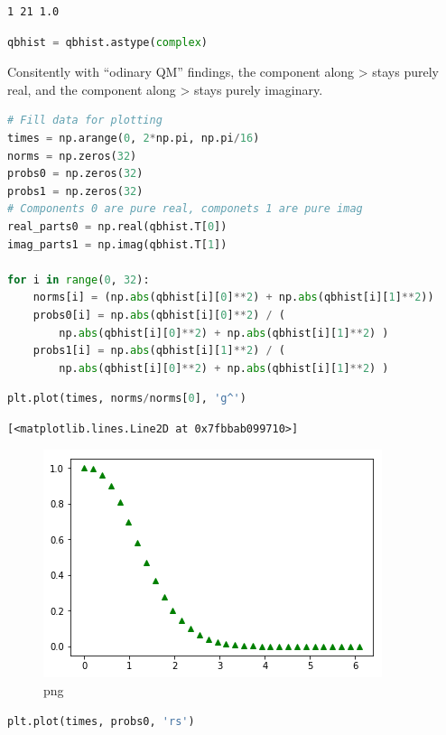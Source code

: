 \begin{lstlisting}
1 21 1.0
\end{lstlisting}

\begin{lstlisting}[language=Python]
qbhist = qbhist.astype(complex)
\end{lstlisting}

Consitently with ``odinary QM'' findings, the component along
\textgreater{} stays purely real, and the component along
\textgreater{} stays purely imaginary.

\begin{lstlisting}[language=Python]
# Fill data for plotting
times = np.arange(0, 2*np.pi, np.pi/16)
norms = np.zeros(32)
probs0 = np.zeros(32)
probs1 = np.zeros(32)
# Components 0 are pure real, componets 1 are pure imag
real_parts0 = np.real(qbhist.T[0])
imag_parts1 = np.imag(qbhist.T[1])

for i in range(0, 32):
    norms[i] = (np.abs(qbhist[i][0]**2) + np.abs(qbhist[i][1]**2))
    probs0[i] = np.abs(qbhist[i][0]**2) / (
        np.abs(qbhist[i][0]**2) + np.abs(qbhist[i][1]**2) )
    probs1[i] = np.abs(qbhist[i][1]**2) / (
        np.abs(qbhist[i][0]**2) + np.abs(qbhist[i][1]**2) )
\end{lstlisting}

\begin{lstlisting}[language=Python]
plt.plot(times, norms/norms[0], 'g^')
\end{lstlisting}

\begin{lstlisting}
[<matplotlib.lines.Line2D at 0x7fbbab099710>]
\end{lstlisting}

\begin{figure}
\centering
\includegraphics[width=0.66\linewidth]{output_82_1.png}
\caption[]{png}
\end{figure}

\begin{lstlisting}[language=Python]
plt.plot(times, probs0, 'rs')
\end{lstlisting}

